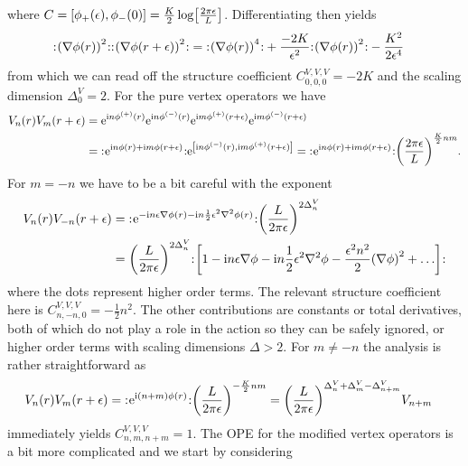 \documentclass[english, parskip=full]{scrartcl}
\begin{document}
where $C=\klb*{\phi_+(\epsilon), \phi_-(0)} = \frac{K}{2} \log \klb*{\frac{2\pi \epsilon}{L}}$.
Differentiating then yields
\begin{align}
\normord{\kla*{\nabla\phi(r)}^2} \normord{\kla*{\nabla\phi(r+\epsilon)}^2} &= \normord{\kla*{\nabla\phi(r)}^4} + \frac{-2K}{\epsilon^2} \normord{\kla*{\nabla\phi(r)}^2} - \frac{K^2}{2\epsilon^4}
\end{align}
from which we can read off the structure coefficient $C_{0,0,0}^{V,V,V} = -2K$ and the scaling dimension $\Delta^V_0 = 2$.
For the pure vertex operators we have
\begin{align}
V_n(r) V_m(r+\epsilon) &= \powe{\i n\phi^{(+)}(r)}\powe{\i n\phi^{(-)}(r)} \powe{\i m\phi^{(+)}(r+\epsilon)} \powe{\i m\phi^{(-)}(r+\epsilon)} \\
&= \normord{\powe{\i n\phi(r) + \i m\phi(r+\epsilon)}} \powe{\klb*{\i n \phi^{(-)}(r), \i m\phi^{(+)}(r+\epsilon)}} = \normord{\powe{\i n\phi(r) + \i m\phi(r+\epsilon)}} \kla*{\frac{2\pi\epsilon}{L}}^{\frac{K}{2}nm}.
\end{align}
For $m=-n$ we have to be a bit careful with the exponent
\begin{align}
V_n(r) V_{-n}(r+\epsilon) &= \normord{\powe{-\i n\epsilon\nabla\phi(r) - \i n \frac{1}{2} \epsilon^2\nabla^2\phi(r)}} \kla*{\frac{L}{2\pi\epsilon}}^{2\Delta^V_n}\\
&= \kla*{\frac{L}{2\pi\epsilon}}^{2\Delta^V_n} \normord{\klb*{1 - \i n\epsilon\nabla\phi - \i n\frac{1}{2} \epsilon^2\nabla^2\phi - \frac{\epsilon^2n^2}{2} \kla*{\nabla\phi}^2 + \dots}}
\end{align}
where the dots represent higher order terms.
The relevant structure coefficient here is $C^{V,V,V}_{n,-n,0} = -\frac{1}{2}n^2$.
The other contributions are constants or total derivatives, both of which do not play a role in the action so they can be safely ignored, or higher order terms with scaling dimensions $\Delta > 2$.
For $m\neq -n$ the analysis is rather straightforward as
\begin{align}
V_n(r) V_m(r+\epsilon) &= \normord{\powe{\i (n+m)\phi(r)}} \kla*{\frac{L}{2\pi\epsilon}}^{-\frac{K}{2}nm} = \kla*{\frac{L}{2\pi \epsilon}}^{\Delta^V_n + \Delta^V_m - \Delta^V_{n+m}} V_{n+m}
\end{align}
immediately yields $C^{V,V,V}_{n,m,n+m} = 1$.
The OPE for the modified vertex operators is a bit more complicated and we start by considering
\end{document}
